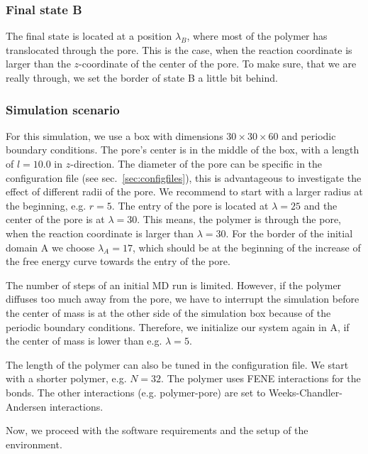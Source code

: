 \documentclass[a4paper,oneside]{article}
\begin{document}
\subsubsection{Final state B}\label{sec:arrivedB}
The final state is located at a position $\lambda_B$, where most of the polymer has translocated through the pore. This is the case, when the reaction coordinate is larger than the $z$-coordinate of the center of the pore. To make sure, that we are really through, we set the border of state B a little bit behind. 

\subsubsection{Simulation scenario}
For this simulation, we use a box with dimensions $30\times30\times60$ and periodic boundary conditions. The pore's center is in the middle of the box, with a length of $l=10.0$ in $z$-direction. The diameter of the pore can be specific in the configuration file (see sec.~\ref{sec:configfiles}), this is advantageous to investigate the effect of different radii of the pore. We recommend to start with a larger radius at the beginning, e.g. $r=5$. The entry of the pore is located at $\lambda=25$ and the center of the pore is at $\lambda=30$. This means, the polymer is through the pore, when the reaction coordinate is larger than $\lambda=30$. For the border of the initial domain A we choose $\lambda_A=17$, which should be at the beginning of the increase of the free energy curve towards the entry of the pore. 

The number of steps of an initial MD run is limited. However, if the polymer diffuses too much away from the pore, we have to interrupt the simulation before the center of mass is at the other side of the simulation box because of the periodic boundary conditions. Therefore, we initialize our system again in A, if the center of mass is lower than e.g. $\lambda=5$.

The length of the polymer can also be tuned in the configuration file. We start with a shorter polymer, e.g. $N=32$. The polymer uses FENE interactions for the bonds. The other interactions (e.g. polymer-pore) are set to Weeks-Chandler-Andersen interactions.

Now, we proceed with the software requirements and the setup of the environment.
\end{document}
